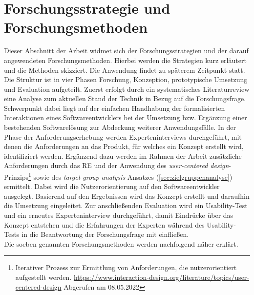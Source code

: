 \section{Forschungsstrategie und Forschungsmethoden}
\label{sec:forschungsstrategie}
    Dieser Abschnitt der Arbeit widmet sich der Forschungsstrategien und der darauf angewendeten Forschungsmethoden. 
    Hierbei werden die Strategien kurz erläutert und die Methoden skizziert. Die Anwendung findet zu 
    späterem Zeitpunkt statt. 
    \\
    Die Struktur ist in vier Phasen Forschung, Konzeption, prototypische Umsetzung und Evaluation aufgeteilt. Zuerst erfolgt durch ein 
    systematisches Literaturreview eine Analyse zum aktuellen Stand der Technik in Bezug auf die Forschungsfrage. 
    Schwerpunkt dabei liegt auf der einfachen Handhabung der formalisierten 
    Interaktionen eines Softwareentwicklers bei der Umsetzung bzw. Ergänzung einer bestehenden 
    Softwarelösung zur Abdeckung weiterer Anwendungsfälle. 
    In der Phase der Anforderungserhebung werden Experteninterviews durchgeführt, mit denen die Anforderungen an das Produkt, 
    für welches ein Konzept erstellt wird, identifiziert werden. Ergänzend dazu werden im Rahmen der Arbeit zusätzliche 
    Anforderungen durch das \ac{RE} und der Anwendung des \textit{user-centered design}-Prinzips\footnote{Iterativer Prozess zur Ermittlung von Anforderungen, die nutzerorientiert aufgestellt werden. \url{https://www.interaction-design.org/literature/topics/user-centered-design} Abgerufen am 08.05.2022} 
    sowie des \textit{target group analysis}-Ansatzes (\ref{sec:zielgruppenanalyse}) ermittelt. Dabei wird die 
    Nutzerorientierung auf den Softwareentwickler ausgelegt. Basierend auf den Ergebnissen wird das Konzept erstellt und daraufhin die Umsetzung eingeleitet. 
    Zur anschließenden Evaluation wird ein Usability-Test und ein erneutes Experteninterview durchgeführt, damit 
    Eindrücke über das Konzept entstehen und die Erfahrungen der Experten während des Usability-Tests 
    in die Beantwortung der Forschungsfrage mit einfließen.
    \\
    Die soeben genannten Forschungsmethoden werden nachfolgend näher erklärt.

